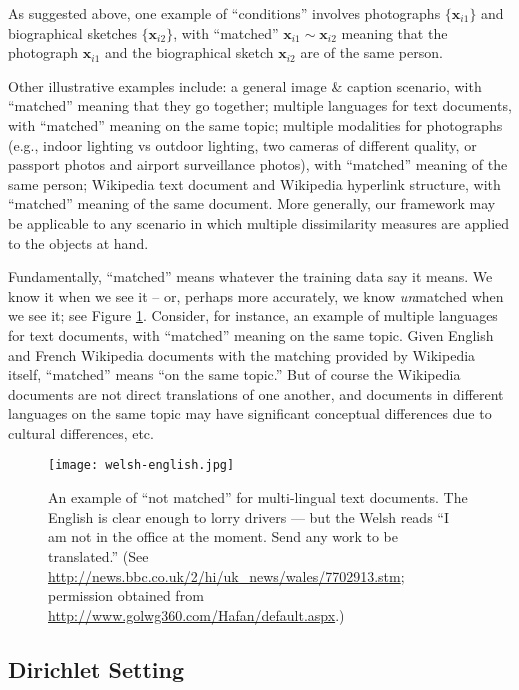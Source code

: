 \documentclass[12pt,xcolor]{article}
\newcommand{\1}{\ensuremath{\mbox{{\bf 1}}}}
\begin{document}
As suggested above,
one example of ``conditions'' involves
photographs $\{\bm{x}_{i1}\}$
and biographical sketches $\{\bm{x}_{i2}\}$,
with ``matched'' $\bm{x}_{i1} \sim \bm{x}_{i2}$
meaning that the photograph $\bm{x}_{i1}$ and the biographical sketch $\bm{x}_{i2}$
are of the same person.

Other illustrative examples include:
a general image \& caption scenario,
with ``matched'' meaning that they go together;
multiple languages for text documents, with ``matched'' meaning on the same topic;
multiple modalities for photographs
(e.g., indoor lighting vs outdoor lighting,
two cameras of different quality, or
passport photos and airport surveillance photos),
with ``matched'' meaning of the same person;
Wikipedia text document and Wikipedia hyperlink structure,
with ``matched'' meaning of the same document.
More generally, our framework may be applicable to any scenario in which multiple dissimilarity measures are applied to the objects at hand.

Fundamentally, ``matched'' means whatever the training data say it means.
We know it when we see it --
or, perhaps more accurately, we know {\em un}matched when we see it; see Figure \ref{fig:notmatched}.
Consider, for instance, an example of
multiple languages for text documents, with ``matched'' meaning on the same topic.
Given English and French Wikipedia documents with the matching provided by Wikipedia itself,
``matched'' means ``on the same topic.''
But of course the Wikipedia documents are not direct translations of one another,
and documents in different languages on the same topic may have significant conceptual differences
due to cultural differences, etc.

\begin{figure}[h]
\begin{center}
\texttt{[image: welsh-english.jpg]}
\caption{
An example of ``not matched'' for multi-lingual text documents.
The English is clear enough to lorry drivers --- but the Welsh reads
``I am not in the office at the moment. Send any work to be translated.''
(See \protect\url{http://news.bbc.co.uk/2/hi/uk_news/wales/7702913.stm};
permission obtained from \protect\url{http://www.golwg360.com/Hafan/default.aspx}.)
}\label{fig:notmatched}
\end{center}
\end{figure}

\subsection{Dirichlet Setting}\label{section:dirichlet}
\end{document}
